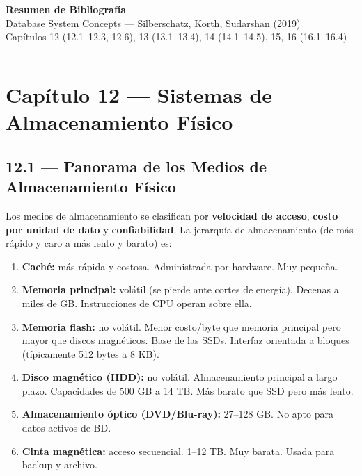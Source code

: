 \documentclass[11pt, a4paper]{article}
\begin{document}
\begin{center}
	{\LARGE\bfseries\color{teal} Resumen de Bibliografía}\\[0.4em]
	{\large Database System Concepts --- Silberschatz, Korth, Sudarshan (2019)}\\[0.2em]
	{\small Capítulos 12 (12.1--12.3, 12.6), 13 (13.1--13.4), 14 (14.1--14.5), 15, 16 (16.1--16.4)}
\end{center}

\vspace{0.5em}
\hrule
\vspace{1em}

\section{Capítulo 12 --- Sistemas de Almacenamiento Físico}

\subsection{12.1 --- Panorama de los Medios de Almacenamiento Físico}

Los medios de almacenamiento se clasifican por \textbf{velocidad de acceso}, \textbf{costo por unidad de dato} y \textbf{confiabilidad}. La jerarquía de almacenamiento (de más rápido y caro a más lento y barato) es:

\begin{enumerate}[nosep]
	\item \textbf{Caché:} más rápida y costosa. Administrada por hardware. Muy pequeña.
	\item \textbf{Memoria principal:} volátil (se pierde ante cortes de energía). Decenas a miles de GB. Instrucciones de CPU operan sobre ella.
	\item \textbf{Memoria flash:} no volátil. Menor costo/byte que memoria principal pero mayor que discos magnéticos. Base de las SSDs. Interfaz orientada a bloques (típicamente 512 bytes a 8 KB).
	\item \textbf{Disco magnético (HDD):} no volátil. Almacenamiento principal a largo plazo. Capacidades de 500 GB a 14 TB. Más barato que SSD pero más lento.
	\item \textbf{Almacenamiento óptico (DVD/Blu-ray):} 27--128 GB. No apto para datos activos de BD.
	\item \textbf{Cinta magnética:} acceso secuencial. 1--12 TB. Muy barata. Usada para backup y archivo.
\end{enumerate}
\end{document}
